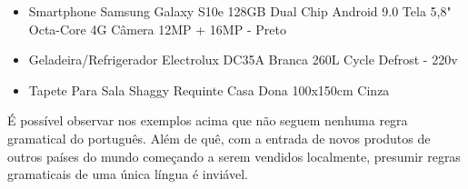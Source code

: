 \begin{itemize}
\item Smartphone Samsung Galaxy S10e 128GB Dual Chip Android 9.0 Tela 5,8" Octa-Core 4G Câmera 12MP + 16MP - Preto
\item Geladeira/Refrigerador Electrolux DC35A Branca 260L Cycle Defrost - 220v
\item Tapete Para Sala Shaggy Requinte Casa Dona 100x150cm Cinza
\end{itemize}

É possível observar nos exemplos acima que não seguem nenhuma regra gramatical do português. Além de quê, com a entrada de novos produtos de outros países do mundo começando a serem vendidos localmente, presumir regras gramaticais de uma única língua é inviável.